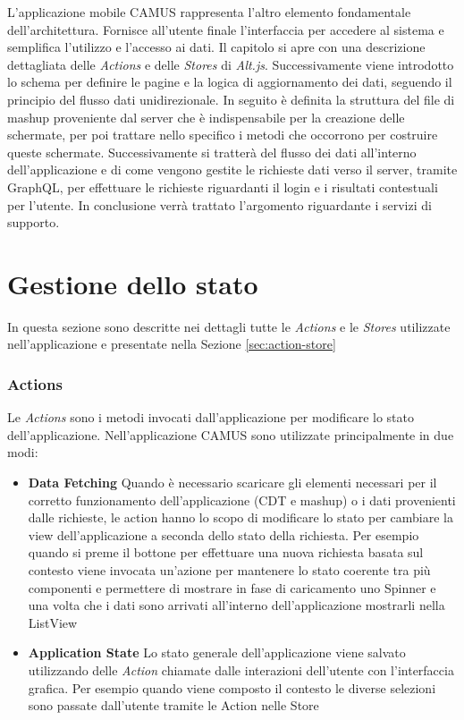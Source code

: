 L'applicazione mobile CAMUS rappresenta l'altro elemento fondamentale dell'ar\-chi\-tet\-tu\-ra. Fornisce all'utente finale l'interfaccia per accedere al sistema e semplifica l'utilizzo e l'accesso ai dati. Il capitolo si apre con una descrizione dettagliata delle \emph{Actions} e delle \emph{Stores} di \emph{Alt.js}. Successivamente viene introdotto lo schema per definire le pagine e la logica di aggiornamento dei dati, seguendo il principio del flusso dati unidirezionale. In seguito è definita la struttura del file di mashup proveniente dal server che è indispensabile per la creazione delle schermate, per poi trattare nello specifico i metodi che occorrono per costruire queste schermate.
Successivamente si tratterà del flusso dei dati all'interno dell'applicazione e di come vengono gestite le richieste dati verso il server, tramite GraphQL, per effettuare le richieste riguardanti il login e i risultati contestuali per l'utente. In conclusione verrà trattato l'argomento riguardante i servizi di supporto.

\section{Gestione dello stato}\label{sec:state-management}
In questa sezione sono descritte nei dettagli tutte le \emph{Actions} e le \emph{Stores} utilizzate nell'applicazione e presentate nella Sezione \ref{sec:action-store}
\subsubsection{Actions\label{sec:actions}}

Le \emph{Actions} sono i metodi invocati dall'ap\-pli\-ca\-zio\-ne per modificare lo stato dell'ap\-pli\-ca\-zio\-ne. Nell'applicazione CAMUS sono utilizzate principalmente in due modi:

\begin{itemize}
	\item \textbf{Data Fetching}
	Quando è necessario scaricare gli elementi necessari per il corretto funzionamento dell'applicazione (CDT e mashup) o i dati provenienti dalle richieste, le action hanno lo scopo di modificare lo stato per cambiare la view dell'applicazione a seconda dello stato della richiesta.
	Per esempio quando si preme il bottone per effettuare una nuova richiesta basata sul contesto viene invocata un'azione per mantenere lo stato coerente tra più componenti e permettere di mostrare in fase di caricamento uno Spinner e una volta che i dati sono arrivati all'interno dell'applicazione mostrarli nella ListView
	\item \textbf{Application State}
	Lo stato generale dell'applicazione viene salvato utilizzando delle \emph{Action} chiamate dalle interazioni dell'utente con l'interfaccia grafica. Per esempio quando viene composto il contesto le diverse selezioni sono passate dall'utente tramite le Action nelle Store
\end{itemize}	

